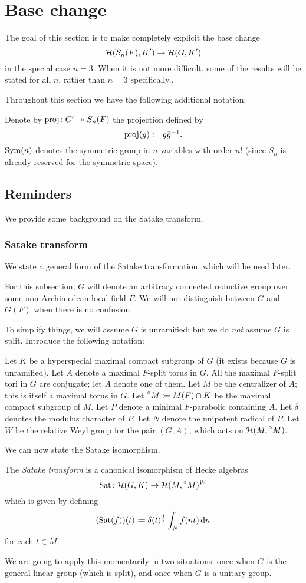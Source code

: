 \section{Base change}
\label{sec:satake}

The goal of this section is to make completely explicit the base change
\[ \mathcal H(S_n(F), K') \to \mathcal H(G, K') \]
in the special case $n = 3$.
When it is not more difficult, some of the results will be stated for all $n$,
rather than $n = 3$ specifically..

Throughout this section we have the following additional notation:
\begin{itemize}
  \ii Denote by $\operatorname{proj} \colon G' \twoheadrightarrow S_n(F)$ the projection defined by
  \[ \operatorname{proj}(g) \coloneqq g \bar{g}^{-1}. \]
  \ii $\operatorname{Sym}(n)$ denotes the symmetric group in $n$ variables with order $n!$
  (since $S_n$ is already reserved for the symmetric space).
\end{itemize}


\subsection{Reminders}
We provide some background on the Satake transform.

\subsubsection{Satake transform}
We state a general form of the Satake transformation, which will be used later.

For this subsection, $G$ will denote an arbitrary connected reductive group
over some non-Archimedean local field $F$.
We will not distinguish between $G$ and $G(F)$ when there is no confusion.

To simplify things, we will assume $G$ is unramified;
but we do \emph{not} assume $G$ is split.
Introduce the following notation:
\begin{itemize}
  \ii Let $K$ be a hyperspecial maximal compact subgroup of $G$
  (it exists because $G$ is unramified).
  \ii Let $A$ denote a maximal $F$-split torus in $G$.
  All the maximal $F$-split tori in $G$ are conjugate; let $A$ denote one of them.
  \ii Let $M$ be the centralizer of $A$; this is itself a maximal torus in $G$.
  \ii Let $\prescript{\circ}{} M \coloneqq M(F) \cap K$
  be the maximal compact subgroup of $M$.
  \ii Let $P$ denote a minimal $F$-parabolic containing $A$.
  \ii Let $\delta$ denotes the modulus character of $P$.
  \ii Let $N$ denote the unipotent radical of $P$.
  \ii Let $W$ be the relative Weyl group for the pair $(G,A)$,
  which acts on $\mathcal H(M, \prescript{\circ}{} M)$.
\end{itemize}
We can now state the Satake isomorphism.
\begin{definition}
  The \emph{Satake transform} is a canonical isomorphism of Hecke algebras
  \[ \operatorname{Sat} \colon \mathcal H(G, K) \to \mathcal H(M, \prescript{\circ}{} M)^W \]
  which is given by defining
  \[ (\Sat(f))(t) \coloneqq \delta(t)^\half \int_N f(nt) \odif n  \]
  for each $t \in M$.
\end{definition}
We are going to apply this momentarily in two situations:
once when $G$ is the general linear group (which is split),
and once when $G$ is a unitary group.

